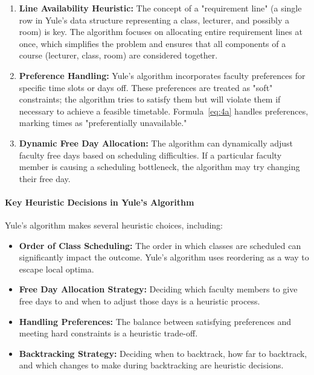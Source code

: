 \begin{enumerate}
    \item \textbf{Line Availability Heuristic:} The concept of a "requirement line" (a single row in Yule's data structure representing a class, lecturer, and possibly a room) is key.
	The algorithm focuses on allocating entire requirement lines at once, which simplifies the problem and ensures that all components of a course (lecturer, class, room) are considered together.

    \item \textbf{Preference Handling:} Yule's algorithm incorporates faculty preferences for specific time slots or days off.
	These preferences are treated as "soft" constraints; the algorithm tries to satisfy them but will violate them if necessary to achieve a feasible timetable.
	Formula~\ref{eq:4a} handles preferences, marking times as "preferentially unavailable."

    \item \textbf{Dynamic Free Day Allocation:} The algorithm can dynamically adjust faculty free days based on scheduling difficulties.
	If a particular faculty member is causing a scheduling bottleneck, the algorithm may try changing their free day.
\end{enumerate}

\paragraph{Key Heuristic Decisions in Yule's Algorithm}

Yule's algorithm makes several heuristic choices, including:

\begin{itemize}
    \item \textbf{Order of Class Scheduling:} The order in which classes are scheduled can significantly impact the outcome.
	Yule's algorithm uses reordering as a way to escape local optima.
    \item \textbf{Free Day Allocation Strategy:} Deciding which faculty members to give free days to and when to adjust those days is a heuristic process.
    \item \textbf{Handling Preferences:} The balance between satisfying preferences and meeting hard constraints is a heuristic trade-off.
    \item \textbf{Backtracking Strategy:} Deciding when to backtrack, how far to backtrack, and which changes to make during backtracking are heuristic decisions.
\end{itemize}

